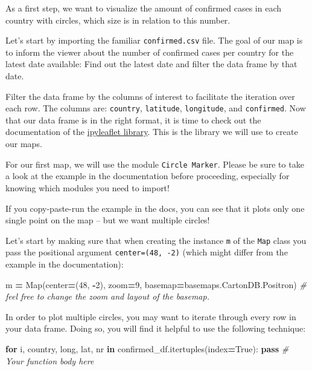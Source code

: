 \documentclass[
  11pt,
]{article}
\newenvironment{Shaded}{\begin{snugshade}}{\end{snugshade}}
\newcommand{\BuiltInTok}[1]{#1}
\newcommand{\CommentTok}[1]{\textcolor[rgb]{0.56,0.35,0.01}{\textit{#1}}}
\newcommand{\ControlFlowTok}[1]{\textcolor[rgb]{0.13,0.29,0.53}{\textbf{#1}}}
\newcommand{\DecValTok}[1]{\textcolor[rgb]{0.00,0.00,0.81}{#1}}
\newcommand{\KeywordTok}[1]{\textcolor[rgb]{0.13,0.29,0.53}{\textbf{#1}}}
\newcommand{\NormalTok}[1]{#1}
\newcommand{\OperatorTok}[1]{\textcolor[rgb]{0.81,0.36,0.00}{\textbf{#1}}}
\newcommand{\VariableTok}[1]{\textcolor[rgb]{0.00,0.00,0.00}{#1}}
\newenvironment{tipsp}[1]
  {
  \begin{itemize}
  \footnotesize
  \renewcommand{\labelitemi}{
    \raisebox{-.7\height}[0pt][0pt]{
      {\setkeys{Gin}{width=3em,keepaspectratio}
        \texttt{[image: images/\#1.png]}}
    }
  }
  \setlength{\fboxsep}{1em}
  \begin{pbox}
  \item
  }
  {
  \end{pbox}
  \end{itemize}
  }
\begin{document}
\begin{tipsp}p

As a first step, we want to visualize the amount of confirmed cases in each country with circles, which size is in relation to this number.

Let's start by importing the familiar \texttt{confirmed.csv} file.
The goal of our map is to inform the viewer about the number of confirmed cases per country for the latest date available: Find out the latest date and filter the data frame by that date.

Filter the data frame by the columns of interest to facilitate the iteration over each row. The columns are: \texttt{country}, \texttt{latitude}, \texttt{longitude}, and \texttt{confirmed}.
Now that our data frame is in the right format, it is time to check out the documentation of the \href{https://ipyleaflet.readthedocs.io/en/latest/}{ipyleaflet library}. This is the library we will use to create our maps.

For our first map, we will use the module \texttt{Circle\ Marker}. Please be sure to take a look at the example in the documentation before proceeding, especially for knowing which modules you need to import!

If you copy-paste-run the example in the docs, you can see that it plots only one single point on the map -- but we want multiple circles!

Let's start by making sure that when creating the instance \texttt{m} of the \texttt{Map} class you pass the positional argument \texttt{center=(48,\ -2)} (which might differ from the example in the documentation):

\begin{Shaded}
\begin{Highlighting}[]
\NormalTok{m }\OperatorTok{=}\NormalTok{ Map(center}\OperatorTok{=}\NormalTok{(}\DecValTok{48}\NormalTok{, }\OperatorTok{{-}}\DecValTok{2}\NormalTok{), zoom}\OperatorTok{=}\DecValTok{9}\NormalTok{, basemap}\OperatorTok{=}\NormalTok{basemaps.CartonDB.Positron)}
\CommentTok{\# feel free to change the zoom and layout of the basemap.}
\end{Highlighting}
\end{Shaded}

In order to plot multiple circles, you may want to iterate through every row in your data frame. Doing so, you will find it helpful to use the following technique:

\begin{Shaded}
\begin{Highlighting}[]
\ControlFlowTok{for}\NormalTok{ i, country, }\BuiltInTok{long}\NormalTok{, lat, nr }\KeywordTok{in}\NormalTok{ confirmed\_df.itertuples(index}\OperatorTok{=}\VariableTok{True}\NormalTok{):}
    \ControlFlowTok{pass}  \CommentTok{\# Your function body here}
\end{Highlighting}
\end{Shaded}


\end{tipsp}
\end{document}
